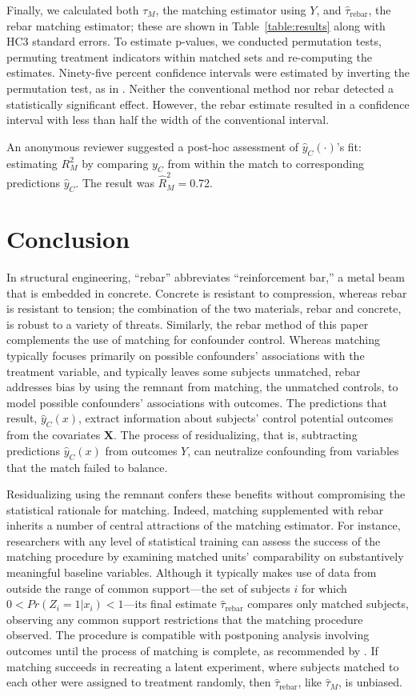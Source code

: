\documentclass[12pt]{article}\usepackage[]{graphicx}\usepackage[]{color}
\newcommand{\est}{\hat{\tau}_{\text{rebar}}}
\newcommand{\yhat}{\hat{y}_C}
\newcommand{\Match}{M}
\newcommand{\algorithm}{\hat{y}_C(\cdot)}
\newcommand{\covMat}{\bm{X}}
\newcommand{\covVec}{x}
\begin{document}
Finally, we calculated both $\tau_\Match$, the matching estimator
using $Y$, and $\est$, the rebar matching estimator; these are shown
in Table~\ref{table:results} along with HC3 standard errors.
To estimate p-values, we conducted permutation tests, permuting treatment indicators within matched sets and re-computing the estimates.
Ninety-five percent confidence intervals were estimated by inverting the permutation test, as in \citet[e.g.][]{rosenbaum2002covariance}.
Neither the conventional method nor rebar detected a statistically significant effect.
However, the rebar estimate resulted in a confidence interval with less than half the width of the conventional interval.

An anonymous reviewer suggested a post-hoc assessment of $\algorithm$'s
fit: estimating $R^2_\Match$ by comparing $y_C$ from within the
match to corresponding predictions $\hat{y}_C$.
The result was $\hat{R}^2_\Match=$0.72.


\section{Conclusion}\label{sec:conclusion}

In structural engineering, ``rebar'' abbreviates ``reinforcement
bar,'' a metal beam that is embedded in concrete. Concrete is resistant to compression, whereas rebar is resistant to tension; the combination of the two materials, rebar and concrete, is robust to a variety of threats.
Similarly, the rebar method of this paper complements the use of matching for confounder control.
Whereas matching typically focuses primarily on possible confounders'
associations with the treatment variable, and typically leaves some
subjects unmatched, rebar addresses bias by using the remnant from
matching, the unmatched controls, to model possible confounders'
associations with outcomes.
The predictions that result, $\yhat (\covVec)$, extract information about
subjects' control potential outcomes from the covariates $\covMat$.
The process of residualizing, that is, subtracting predictions
$\yhat (\covVec)$ from outcomes $Y$, can neutralize confounding from variables that the
match failed to balance.

Residualizing using the remnant confers these benefits without
compromising the statistical rationale for matching.
Indeed, matching supplemented with rebar inherits a number of central
attractions of the matching estimator.  For instance, researchers with
any level of statistical training can assess the success of the
matching procedure by examining matched units' comparability on
substantively meaningful baseline variables.  Although it typically
makes use of data from outside the range of common support---the set
of subjects $i$ for which $0<Pr(Z_i=1|\covVec_i)<1$---its final
estimate $\est$ compares only matched subjects, observing any common
support restrictions that the matching procedure observed.  The
procedure is compatible with postponing analysis involving outcomes
until the process of matching is complete, as recommended by
\citet{rubin2008objective}.  If matching succeeds in recreating a
latent experiment, where subjects matched to each other were assigned
to treatment randomly, then $\est$, like
$\hat{\tau}_\Match$, is unbiased.
\end{document}
